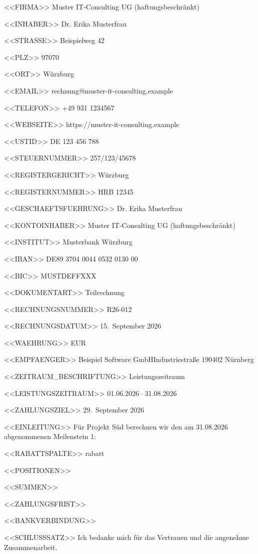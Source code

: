 <<FIRMA>>
Muster IT-Consulting UG (haftungsbeschränkt)

<<INHABER>>
Dr. Erika Musterfrau

<<STRASSE>>
Beispielweg 42

<<PLZ>>
97070

<<ORT>>
Würzburg

<<EMAIL>>
rechnung@muster-it-consulting.example

<<TELEFON>>
+49 931 1234567

<<WEBSEITE>>
https://muster-it-consulting.example

<<USTID>>
DE 123 456 788

<<STEUERNUMMER>>
257/123/45678

<<REGISTERGERICHT>>
Würzburg

<<REGISTERNUMMER>>
HRB 12345

<<GESCHAEFTSFUEHRUNG>>
Dr. Erika Musterfrau

<<KONTOINHABER>>
Muster IT-Consulting UG (haftungsbeschränkt)

<<INSTITUT>>
Musterbank Würzburg

<<IBAN>>
DE89 3704 0044 0532 0130 00

<<BIC>>
MUSTDEFFXXX

<<DOKUMENTART>>
Teilrechnung

<<RECHNUNGSNUMMER>>
R26-012

<<RECHNUNGSDATUM>>
15.~September 2026

<<WAEHRUNG>>
EUR

<<EMPFAENGER>>
Beispiel Software GmbH\zeilenwechsel{}Industriestraße 1\zeilenwechsel{}90402 Nürnberg

<<ZEITRAUM_BESCHRIFTUNG>>
Leistungszeitraum

<<LEISTUNGSZEITRAUM>>
01.06.2026\,–\,31.08.2026

<<ZAHLUNGSZIEL>>
29.~September 2026

<<EINLEITUNG>>
Für Projekt Süd berechnen wir den am 31.08.2026 abgenommenen Meilenstein 1:

<<RABATTSPALTE>>
rabatt

<<POSITIONEN>>
 \positionstrenner{}
 \positionstrenner{}

<<SUMMEN>>
   \summentrenner{}

<<ZAHLUNGSFRIST>>

<<BANKVERBINDUNG>>
\bankblock{}

<<SCHLUSSSATZ>>
Ich bedanke mich für das Vertrauen und die angenehme Zusammenarbeit.
